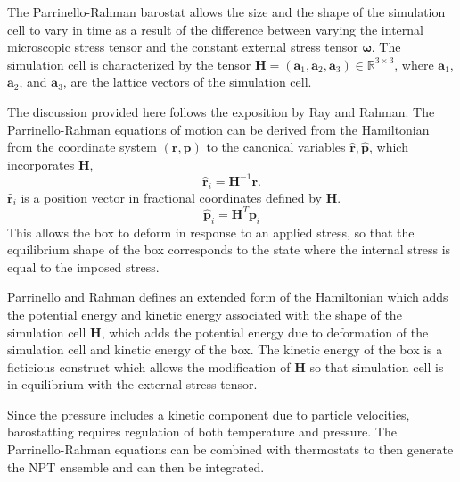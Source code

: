 The Parrinello-Rahman barostat\cite{parrinello1980_barostat,parrinello1981_barostat} allows the size and the shape of the simulation cell to vary in time as a result of the difference between varying the internal microscopic stress tensor and the constant external stress tensor $\bm{\omega}$.  The simulation cell is characterized by the tensor $\bm{H}=(\bm{a}_1,\bm{a}_2,\bm{a}_3) \in \mathbb{R}^{3 \times 3}$, where $\bm{a}_1$, $\bm{a}_2$, and $\bm{a}_3$, are the lattice vectors of the simulation cell.

The discussion provided here follows the exposition by Ray and Rahman\cite{ray1984_npt}.  The Parrinello-Rahman equations of motion can be derived from the Hamiltonian from the coordinate system $(\bm{r},\bm{p})$ to the canonical variables $\hat{\bm{r}},\hat{\bm{p}}$, which incorporates $\bm{H}$,
\begin{equation}
  \hat{\bm{r}}_i = \bm{H}^{-1} \bm{r}.
\end{equation}
$\hat{\bm{r}}_i$ is a position vector in fractional coordinates defined by $\bm{H}$.
\begin{equation}
  \hat{\bm{p}}_i = \bm{H}^T \bm{p}_i
\end{equation}
This allows the box to deform in response to an applied stress, so that the equilibrium shape of the box corresponds to the state where the internal stress is equal to the imposed stress.

Parrinello and Rahman defines an extended form of the Hamiltonian which adds the potential energy and kinetic energy associated with the shape of the simulation cell $\bm{H}$, which adds the potential energy due to deformation of the simulation cell and kinetic energy of the box.  The kinetic energy of the box is a ficticious construct which allows the modification of $\bm{H}$ so that simulation cell is in equilibrium with the external stress tensor.

Since the pressure includes a kinetic component due to particle velocities, barostatting requires regulation of both temperature and pressure.
The Parrinello-Rahman equations can be combined with thermostats to then generate the NPT ensemble\cite{shinoda2004_nosehoover} and can then be integrated\cite{tuckerman2006_timeintegrator}.


